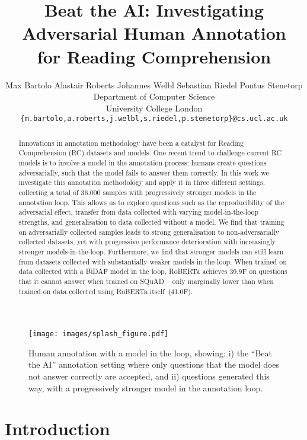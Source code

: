 \documentclass[11pt,a4paper]{article}
\title{Beat the AI: Investigating Adversarial Human Annotation\\for Reading Comprehension}
\author{
  Max Bartolo \quad Alastair Roberts \quad Johannes Welbl \quad Sebastian Riedel \quad Pontus Stenetorp \\
  Department of Computer Science \\
  University College London \\
  {\tt \{m.bartolo,a.roberts,j.welbl,s.riedel,p.stenetorp\}@cs.ucl.ac.uk}
}
\date{}
\newcommand{\squad}{SQuAD}
\begin{document}
\maketitle

\begin{abstract}
Innovations in annotation methodology have been a catalyst for Reading Comprehension (RC) datasets and models.
One recent trend to challenge current RC models is to involve a model in the annotation process: humans create questions adversarially, such that the model fails to answer them correctly.
In this work we investigate this annotation methodology and apply it in three different settings, collecting a total of 36,000 samples with progressively stronger models in the annotation loop.
This allows us to explore questions such as the reproducibility of the adversarial effect, transfer from data collected with varying model-in-the-loop strengths, and generalisation to data collected without a model.
We find that training on adversarially collected samples leads to strong generalisation to non-adversarially collected datasets, yet with progressive performance deterioration with increasingly stronger models-in-the-loop.
Furthermore, we find that stronger models can still learn from datasets collected with substantially weaker models-in-the-loop.
When trained on data collected with a BiDAF model in the loop, RoBERTa achieves 39.9F on questions that it cannot answer when trained on \squad{} -- only marginally lower than when trained on data collected using RoBERTa itself~(41.0F).
\end{abstract}


\begin{figure}[t]
    \centering
    \texttt{[image: images/splash\_figure.pdf]}
    \caption{Human annotation with a model in the loop, showing: i) the ``Beat the AI'' annotation setting where only questions that the model does not answer correctly are accepted, and ii) questions generated this way, with a progressively stronger model in the annotation loop.
    } 
    \label{fig:progression}
\end{figure}


\section{Introduction}
\end{document}
